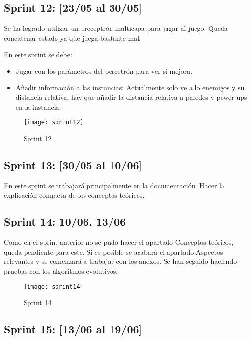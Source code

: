 \subsection{Sprint 12: [23/05 al 30/05]}

Se ha logrado utilizar un preceptrón multicapa para jugar al juego. Queda concatenar estado ya que juega bastante mal.

En este sprint se debe:
\begin{itemize}
    \item Jugar con los parámetros del percetrón para ver si mejora.
    \item Añadir información a las instancias: Actualmente solo ve a lo enemigos y su distancia relativa, hay que añadir la distancia relativa a paredes y power ups en la instancia. 
\end{itemize}

\begin{figure}[h!]
    \centering
    \texttt{[image: sprint12]}
    \caption{Sprint 12}
    \label{fig:s12}
\end{figure}

\subsection{Sprint 13: [30/05 al 10/06]}

En este sprint se trabajará principalmente en la documentación. Hacer la explicación completa de los conceptos teóricos.


\subsection{Sprint 14:  10/06, 13/06}

Como en el sprint anterior no se pudo hacer el apartado Conceptos teóricos, queda pendiente para este. Si es posible se acabará el apartado Aspectos relevantes y se comenzará a trabajar con los anexos. Se han seguido haciendo pruebas con los algoritmos evolutivos.

\begin{figure}[h!]
    \centering
    \texttt{[image: sprint14]}
    \caption{Sprint 14}
    \label{fig:s14}
\end{figure}

\subsection{Sprint 15: [13/06 al 19/06]}

